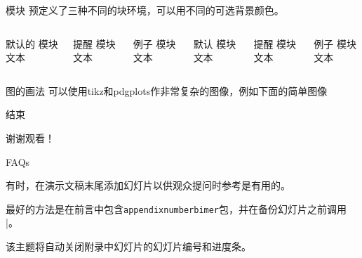 \documentclass{kw}
\begin{document}
\begin{frame}{模块}
	预定义了三种不同的块环境，可以用不同的可选背景颜色。
	
	\begin{columns}[T,onlytextwidth]
		\begin{block}{默认的}
			模块文本
		\end{block}
		
		\begin{alertblock}{提醒}
			模块文本
		\end{alertblock}
		
		\begin{exampleblock}{例子}
			模块文本
		\end{exampleblock}
		
		
		\begin{block}{默认}
			模块文本
		\end{block}
		
		\begin{alertblock}{提醒}
			模块文本
		\end{alertblock}
		
		\begin{exampleblock}{例子}
			模块文本
		\end{exampleblock}
		
	\end{columns}
\end{frame}
\begin{frame}{图的画法}
可以使用tikz和pdgplots作非常复杂的图像，例如下面的简单图像
	\begin{figure}
	\end{figure}
\end{frame}

\begin{frame}{结束}
	\begin{center}
		\Huge 谢谢观看！
	\end{center}
\end{frame}


\appendix
\begin{frame}[fragile]{FAQs}

有时，在演示文稿末尾添加幻灯片以供观众提问时参考是有用的。
	
最好的方法是在前言中包含\verb|appendixnumberbimer|包，并在备份幻灯片之前调用\verb|| \appendix|。
	
该主题将自动关闭附录中幻灯片的幻灯片编号和进度条。

\end{frame}
\end{document}
